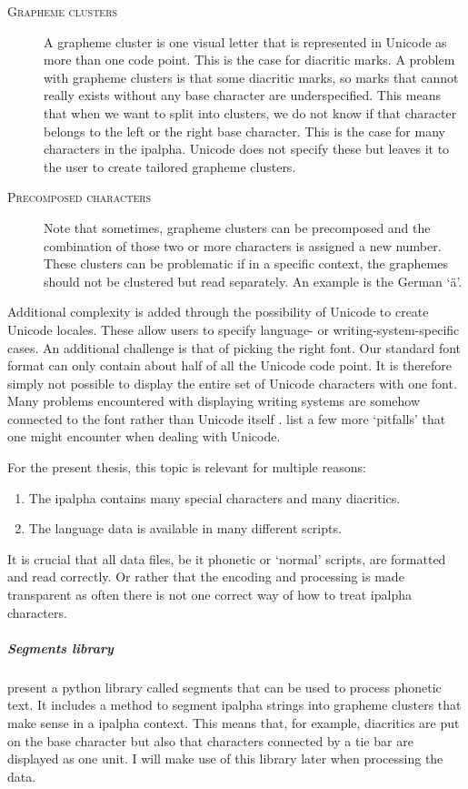 \begin{description}
\item[\textsc{Grapheme clusters}] A grapheme cluster is one visual letter that is represented in Unicode as more than one code point. This is the case for diacritic marks. A problem with grapheme clusters is that some diacritic marks, so marks that cannot really exists without any base character are underspecified. This means that when we want to split into clusters, we do not know if that character belongs to the left or the right base character. This is the case for many characters in the \ac{ipalpha}. Unicode does not specify these but leaves it to the user to create tailored grapheme clusters. 
\item[\textsc{Precomposed characters}] Note that sometimes, grapheme clusters can be precomposed and the combination of those two or more characters is assigned a new number. These clusters can be problematic if in a specific context, the graphemes should not be clustered but read separately. An example is the German `ä'. 
\end{description} 

Additional complexity is added through the possibility of Unicode to create Unicode locales. These allow users to specify language- or writing-system-specific cases. An additional challenge is that of picking the right font. Our standard font format can only contain about half of all the Unicode code point. It is therefore simply not possible to display the entire set of Unicode characters with one font. Many problems encountered with displaying writing systems are somehow connected to the font rather than Unicode itself \citep{unicode-lingu}. \citet{unicode-lingu} list a few more `pitfalls' that one might encounter when dealing with Unicode.

For the present thesis, this topic is relevant for multiple reasons: 
\begin{enumerate}
\item The \ac{ipalpha} contains many special characters and many diacritics.
\item The language data is available in many different scripts.
\end{enumerate} 

It is crucial that all data files, be it phonetic or `normal' scripts, are formatted and read correctly. Or rather that the encoding and processing is made transparent as often there is not one correct way of how to treat \ac{ipalpha} characters. 

\subparagraph{Segments library} \citet{unicode-lingu} present a python library called segments that can be used to process phonetic text. It includes a method to segment \ac{ipalpha} strings into grapheme clusters that make sense in a \ac{ipalpha} context. This means that, for example, diacritics are put on the base character but also that characters connected by a tie bar are displayed as one unit. I will make use of this library later when processing the data.

